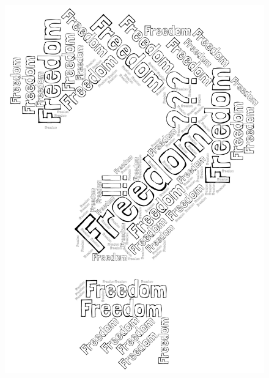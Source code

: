 \documentclass[aspectratio=169,usenames,dvipsnames]{beamer}
\begin{document}
\begin{frame}[t]{\hspace{2mm}}
\begin{minipage}{\textwidth}
\begin{figure}
  \centering
  \includegraphics[scale=0.11]{images/question.png}  
\end{figure}  
\end{minipage}

\vspace*{100mm}
\end{frame}
\end{document}

